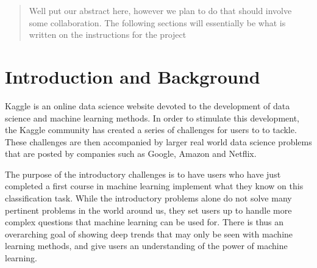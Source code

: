 \documentclass{article}
\begin{document}
 


\begin{abstract} 
Well put our abstract here, however we plan to do that should involve some collaboration. The following sections will essentially be what is written on the instructions for the project
\end{abstract} 

\section{Introduction and Background}
\label{intro}


Kaggle is an online data science website devoted to the development of data science and machine learning methods. In order to stimulate this development, the Kaggle community has created a series of challenges for users to to tackle. These challenges are then accompanied by larger real world data science problems that are posted by companies such as Google, Amazon and Netflix. 

The purpose of the introductory challenges is to have users who have just completed a first course in machine learning implement what they know on this classification task. While the introductory problems alone do not solve many pertinent problems in the world around us, they set users up to handle more complex questions that machine learning can be used for. There is thus an overarching goal of showing deep trends that may only be seen with machine learning methods, and give users an understanding of the power of machine learning.
\end{document}
